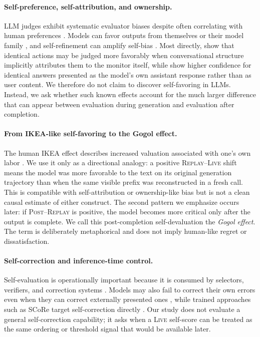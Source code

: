 \documentclass[10pt]{article}
\newcommand{\live}{\textsc{Live}}
\newcommand{\replay}{\textsc{Replay}}
\newcommand{\post}{\textsc{Post}}
\begin{document}
\paragraph{Self-preference, self-attribution, and ownership.}
LLM judges exhibit systematic evaluator biases despite often correlating with human preferences \citep{zheng2023judge,wang2024fair}. Models can favor outputs from themselves or their model family \citep{liu2024narcissistic,panickssery2024recognize,wataoka2024selfpreference}, and self-refinement can amplify self-bias \citep{xu2024pride}. Most directly, \citet{khullar2026selfattribution} show that identical actions may be judged more favorably when conversational structure implicitly attributes them to the monitor itself, while \citet{sanzguerrero2026ownership} show higher confidence for identical answers presented as the model's own assistant response rather than as user content. We therefore do not claim to discover self-favoring in LLMs. Instead, we ask whether such known effects account for the much larger difference that can appear between evaluation during generation and evaluation after completion.

\paragraph{From IKEA-like self-favoring to the Gogol effect.}
The human IKEA effect describes increased valuation associated with one's own labor \citep{norton2012ikea}. We use it only as a directional analogy: a positive \replay{}--\live{} shift means the model was more favorable to the text on its original generation trajectory than when the same visible prefix was reconstructed in a fresh call. This is compatible with self-attribution or ownership-like bias but is not a clean causal estimate of either construct. The second pattern we emphasize occurs later: if \post{}--\replay{} is positive, the model becomes more critical only after the output is complete. We call this post-completion self-devaluation the \emph{Gogol effect}. The term is deliberately metaphorical and does not imply human-like regret or dissatisfaction.

\paragraph{Self-correction and inference-time control.}
Self-evaluation is operationally important because it is consumed by selectors, verifiers, and correction systems \citep{wang2023selfconsistency,lightman2023verify,snell2024testtime}. Models may also fail to correct their own errors even when they can correct externally presented ones \citep{tsui2025selfcorrection}, while trained approaches such as SCoRe target self-correction directly \citep{kumar2025score}. Our study does not evaluate a general self-correction capability; it asks when a \live{} self-score can be treated as the same ordering or threshold signal that would be available later.
\end{document}
